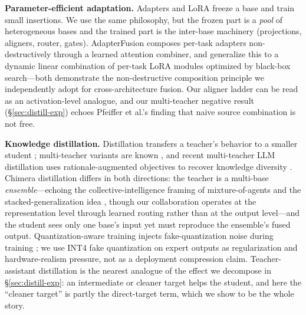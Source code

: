 \documentclass[10pt]{article}
\theoremstyle{definition}
\theoremstyle{plain}
\theoremstyle{remark}
\begin{document}
\textbf{Parameter-efficient adaptation.} Adapters \citep{houlsby2019} and LoRA \citep{hu2022} freeze a base and train small insertions. We use the same philosophy, but the frozen part is a \emph{pool} of heterogeneous bases and the trained part is the inter-base machinery (projections, aligners, router, gates). AdapterFusion \citep{pfeiffer2021} composes per-task adapters non-destructively through a learned attention combiner, and \citet{huang2024lorahub} generalize this to a dynamic linear combination of per-task LoRA modules optimized by black-box search---both demonstrate the non-destructive composition principle we independently adopt for cross-architecture fusion. Our aligner ladder can be read as an activation-level analogue, and our multi-teacher negative result (\S\ref{sec:distill-exp}) echoes Pfeiffer et al.'s finding that naive source combination is not free.

\textbf{Knowledge distillation.} Distillation transfers a teacher's behavior to a smaller student \citep{hintonDistillingKnowledgeNeural2015,sanh2019,gou2021}; multi-teacher variants are known \citep{you2017}, and recent multi-teacher LLM distillation uses rationale-augmented objectives to recover knowledge diversity \citep{tian2025tinyllm}. Chimera distillation differs in both directions: the teacher is a multi-base \emph{ensemble}---echoing the collective-intelligence framing of mixture-of-agents \citep{wang2024moa} and the stacked-generalization idea \citep{wolpertStackedGeneralization1992}, though our collaboration operates at the representation level through learned routing rather than at the output level---and the student sees only one base's input yet must reproduce the ensemble's fused output. Quantization-aware training injects fake-quantization noise during training \citep{dettmers2022}; we use INT4 fake quantization on expert outputs as regularization and hardware-realism pressure, not as a deployment compression claim. Teacher-assistant distillation \citep{mirzadeh2020} is the nearest analogue of the effect we decompose in \S\ref{sec:distill-exp}: an intermediate or cleaner target helps the student, and here the ``cleaner target'' is partly the direct-target term, which we show to be the whole story.
\end{document}
